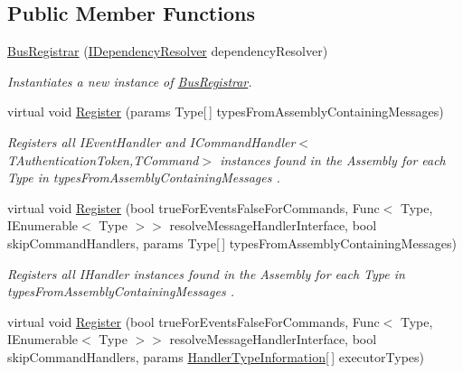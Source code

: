 \subsection*{Public Member Functions}
\begin{DoxyCompactItemize}
\item 
\hyperlink{classCqrs_1_1Configuration_1_1BusRegistrar_a4a934d21a535b28af6c67154512bba20_a4a934d21a535b28af6c67154512bba20}{Bus\+Registrar} (\hyperlink{interfaceCqrs_1_1Configuration_1_1IDependencyResolver}{I\+Dependency\+Resolver} dependency\+Resolver)
\begin{DoxyCompactList}\small\item\em Instantiates a new instance of \hyperlink{classCqrs_1_1Configuration_1_1BusRegistrar}{Bus\+Registrar}. \end{DoxyCompactList}\item 
virtual void \hyperlink{classCqrs_1_1Configuration_1_1BusRegistrar_ab8deb04dc9cb6b80f32b54c847dfb1b3_ab8deb04dc9cb6b80f32b54c847dfb1b3}{Register} (params Type\mbox{[}$\,$\mbox{]} types\+From\+Assembly\+Containing\+Messages)
\begin{DoxyCompactList}\small\item\em Registers all I\+Event\+Handler and I\+Command\+Handler$<$\+T\+Authentication\+Token,\+T\+Command$>$ instances found in the Assembly for each Type in {\itshape types\+From\+Assembly\+Containing\+Messages} . \end{DoxyCompactList}\item 
virtual void \hyperlink{classCqrs_1_1Configuration_1_1BusRegistrar_abc3af2b8dfeeb49f5e5461456ae01f67_abc3af2b8dfeeb49f5e5461456ae01f67}{Register} (bool true\+For\+Events\+False\+For\+Commands, Func$<$ Type, I\+Enumerable$<$ Type $>$$>$ resolve\+Message\+Handler\+Interface, bool skip\+Command\+Handlers, params Type\mbox{[}$\,$\mbox{]} types\+From\+Assembly\+Containing\+Messages)
\begin{DoxyCompactList}\small\item\em Registers all I\+Handler instances found in the Assembly for each Type in {\itshape types\+From\+Assembly\+Containing\+Messages} . \end{DoxyCompactList}\item 
virtual void \hyperlink{classCqrs_1_1Configuration_1_1BusRegistrar_abb83d8748bd598e728a90b51b4a93c35_abb83d8748bd598e728a90b51b4a93c35}{Register} (bool true\+For\+Events\+False\+For\+Commands, Func$<$ Type, I\+Enumerable$<$ Type $>$$>$ resolve\+Message\+Handler\+Interface, bool skip\+Command\+Handlers, params \hyperlink{classCqrs_1_1Configuration_1_1BusRegistrar_1_1HandlerTypeInformation}{Handler\+Type\+Information}\mbox{[}$\,$\mbox{]} executor\+Types)

\end{DoxyCompactItemize}
